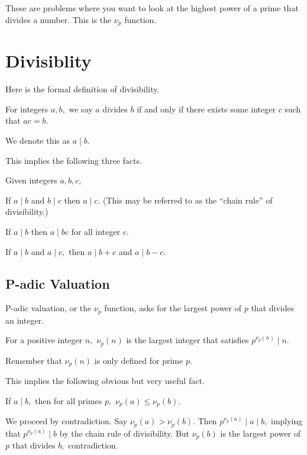 \documentclass[blue,onecol]{shooting}
\begin{document}
These are problems where you want to look at the highest power of a prime that divides a number. This is the $\nu_p$ function.

\section{Divisiblity}

Here is the formal definition of divisibility.

\begin{defi}[Divisibility]
For integers $a,b,$ we say $a$ divides $b$ if and only if there exists some integer $c$ such that $ac=b.$

We denote this as $a\mid b.$ %
\end{defi}
This implies the following three facts.

\begin{fact}
Given integers $a,b,c,$
\begin{itemize}
    \Item If $a\mid b$ and $b\mid c$ then $a\mid c.$ (This may be referred to as the “chain rule” of divisibility.)
    
    \Item If $a\mid b$ then $a\mid bc$ for all integer $c.$
    
    \Item If $a\mid b$ and $a\mid c,$ then $a\mid b+c$ and $a\mid b-c.$
\end{itemize}
\end{fact}

\subsection{P-adic Valuation}

P-adic valuation, or the $\nu_p$ function, asks for the largest power of $p$ that divides an integer.

\begin{defi}
For a positive integer $n,$ $\nu_p(n)$ is the largest integer that satisfies $p^{\nu_p(n)}\mid n.$
\end{defi}

Remember that $\nu_p(n)$ is only defined for prime $p.$

This implies the following obvious but very useful fact.

\begin{fact}
If $a\mid b,$ then for all primes $p,$ $\nu_p(a)\leq \nu_p(b).$
\end{fact}

\begin{pro}
We proceed by contradiction. Say $\nu_p(a)>\nu_p(b).$ Then $p^{\nu_p(a)}\mid a\mid b,$ implying that $p^{\nu_p(a)}\mid b$ by the chain rule of divisibility. But $\nu_p(b)$ is the largest power of $p$ that divides $b,$ contradiction.
\end{pro}
\end{document}
